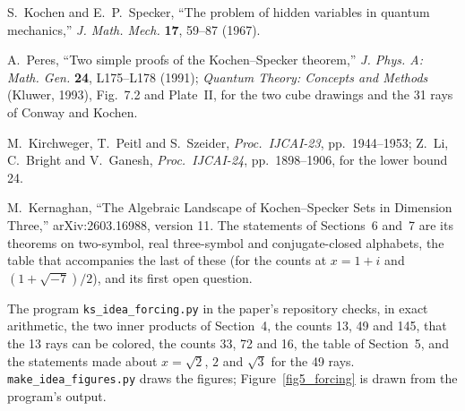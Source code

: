 \documentclass[11pt]{article}
\newcounter{fig}
\begin{document}
{\small
S.~Kochen and E.~P.~Specker, ``The problem of hidden variables in quantum mechanics,''
\textit{J. Math. Mech.} \textbf{17}, 59--87 (1967).

A.~Peres, ``Two simple proofs of the Kochen--Specker theorem,'' \textit{J. Phys. A: Math. Gen.}
\textbf{24}, L175--L178 (1991); \textit{Quantum Theory: Concepts and Methods} (Kluwer, 1993),
Fig.~7.2 and Plate~II, for the two cube drawings and the 31 rays of Conway and Kochen.

M.~Kirchweger, T.~Peitl and S.~Szeider, \textit{Proc.\ IJCAI-23}, pp.~1944--1953; Z.~Li,
C.~Bright and V.~Ganesh, \textit{Proc.\ IJCAI-24}, pp.~1898--1906, for the lower bound 24.

M.~Kernaghan, ``The Algebraic Landscape of Kochen--Specker Sets in Dimension Three,''
arXiv:2603.16988, version 11.  The statements of Sections~6 and~7 are its theorems on
two-symbol, real three-symbol and conjugate-closed alphabets, the table that accompanies the
last of these (for the counts at $x=1+i$ and $(1+\sqrt{-7})/2$), and its first open question.

The program \texttt{ks\_idea\_forcing.py} in the paper's repository checks, in exact arithmetic,
the two inner products of Section~4, the counts 13, 49 and 145, that the 13 rays can be colored,
the counts 33, 72 and 16, the table of Section~5, and the statements made about
$x=\sqrt2$, $2$ and $\sqrt3$ for the 49 rays.  \texttt{make\_idea\_figures.py} draws the
figures; Figure~\ref{fig5_forcing} is drawn from the program's output.
}
\end{document}
